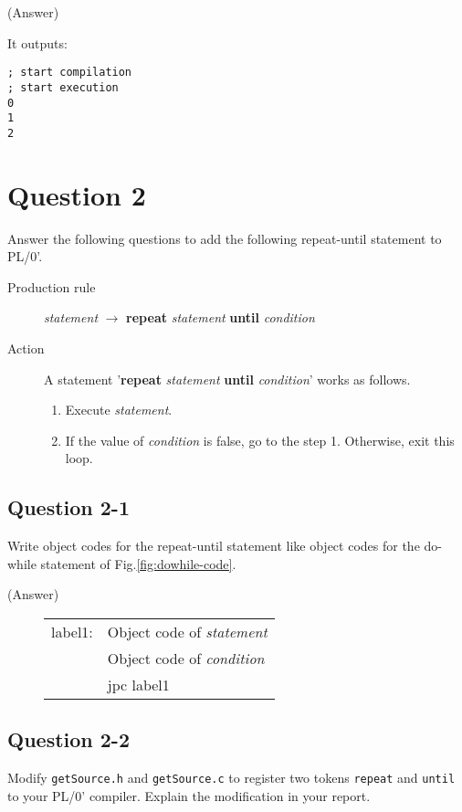 \documentclass{article}
\begin{document}
\ifreport
(Answer)\\
\fi

It outputs:
\begin{verbatim}
; start compilation
; start execution
0
1
2
\end{verbatim}


\newpage
\section*{Question 2}
Answer the following questions to add the following repeat-until statement to PL/0'.

\begin{description}
 \item[Production rule] {\it statement}  $\to$ {\bf repeat} {\it statement} {\bf until} {\it condition}
 \item[Action] A statement '{\bf repeat} {\it statement} {\bf until} {\it condition}' works as follows.
	    \begin{enumerate}
	     \item Execute {\it statement}.
	     \item If the value of {\it condition} is false, go to the step 1. Otherwise, exit this loop.
	    \end{enumerate}
\end{description}

\subsection*{Question 2-1}
Write object codes for the repeat-until statement 
like object codes for the do-while statement of Fig.\ref{fig:dowhile-code}.

\ifreport
(Answer)\\
\fi

\begin{figure}[h]
\begin{tabular}{ll}
label1: & Object code of {\it statement} \\
        & Object code of {\it condition} \\
        & jpc label1 \\
\end{tabular}
\end{figure}


\subsection*{Question 2-2}
Modify {\tt getSource.h} and {\tt getSource.c} to register two tokens
{\tt repeat} and {\tt until} to your PL/0' compiler.
Explain the modification in your report.
\end{document}

